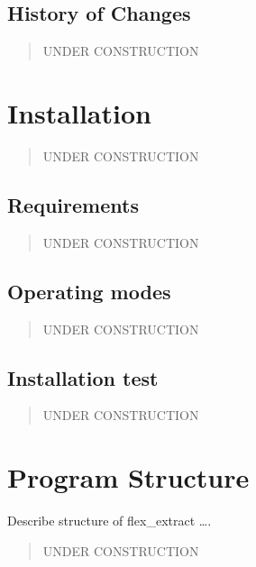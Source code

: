 \documentclass[letterpaper,10pt,english]{sphinxmanual}
\begin{document}
\section{History of Changes}
\label{\detokenize{downloads/history_changes:history-of-changes}}\label{\detokenize{downloads/history_changes::doc}}\begin{quote}

UNDER CONSTRUCTION
\end{quote}


\chapter{Installation}
\label{\detokenize{installation:installation}}\label{\detokenize{installation::doc}}\begin{quote}

UNDER CONSTRUCTION
\end{quote}


\section{Requirements}
\label{\detokenize{installation/requirements:requirements}}\label{\detokenize{installation/requirements::doc}}\begin{quote}

UNDER CONSTRUCTION
\end{quote}


\section{Operating modes}
\label{\detokenize{installation/oper_modes:operating-modes}}\label{\detokenize{installation/oper_modes::doc}}\begin{quote}

UNDER CONSTRUCTION
\end{quote}


\section{Installation test}
\label{\detokenize{installation/test_install:installation-test}}\label{\detokenize{installation/test_install::doc}}\begin{quote}

UNDER CONSTRUCTION
\end{quote}


\chapter{Program Structure}
\label{\detokenize{program_structure:program-structure}}\label{\detokenize{program_structure::doc}}
Describe structure of flex\_extract ….
\begin{quote}

UNDER CONSTRUCTION
\end{quote}
\end{document}
